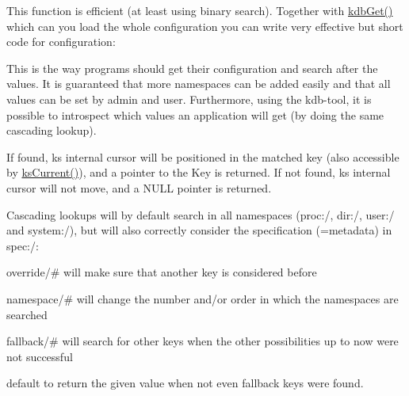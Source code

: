 This function is efficient (at least using binary search). Together with \hyperlink{group__kdb_ga28e385fd9cb7ccfe0b2f1ed2f62453a1}{kdb\+Get()} which can you load the whole configuration you can write very effective but short code for configuration\+:


 This is the way programs should get their configuration and search after the values. It is guaranteed that more namespaces can be added easily and that all values can be set by admin and user. Furthermore, using the kdb-\/tool, it is possible to introspect which values an application will get (by doing the same cascading lookup).

If found, {\ttfamily ks} internal cursor will be positioned in the matched key (also accessible by \hyperlink{group__keyset_ga4287b9416912c5f2ab9c195cb74fb094}{ks\+Current()}), and a pointer to the Key is returned. If not found, {\ttfamily ks} internal cursor will not move, and a N\+U\+LL pointer is returned.

Cascading lookups will by default search in all namespaces (proc\+:/, dir\+:/, user\+:/ and system\+:/), but will also correctly consider the specification (=metadata) in spec\+:/\+:


\begin{DoxyItemize}
\item {\ttfamily override/\#} will make sure that another key is considered before
\item {\ttfamily namespace/\#} will change the number and/or order in which the namespaces are searched
\item {\ttfamily fallback/\#} will search for other keys when the other possibilities up to now were not successful
\item {\ttfamily default} to return the given value when not even {\ttfamily fallback} keys were found.
\end{DoxyItemize}

